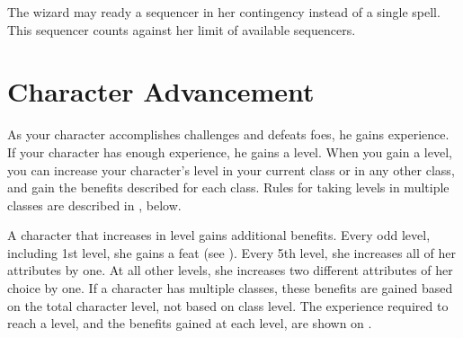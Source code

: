 The wizard may ready a sequencer in her contingency instead of a single spell.
This sequencer counts against her limit of available sequencers.

\section{Character Advancement}\label{Character Advancement}

As your character accomplishes challenges and defeats foes, he gains experience.
If your character has enough experience, he gains a level.
When you gain a level, you can increase your character's level in your current class or in any other class, and gain the benefits described for each class.
Rules for taking levels in multiple classes are described in , below.

A character that increases in level gains additional benefits.
Every odd level, including 1st level, she gains a feat (see ).
Every 5th level, she increases all of her attributes by one.
At all other levels, she increases two different attributes of her choice by one.
If a character has multiple classes, these benefits are gained based on the total character level, not based on class level.
The experience required to reach a level, and the benefits gained at each level, are shown on .

